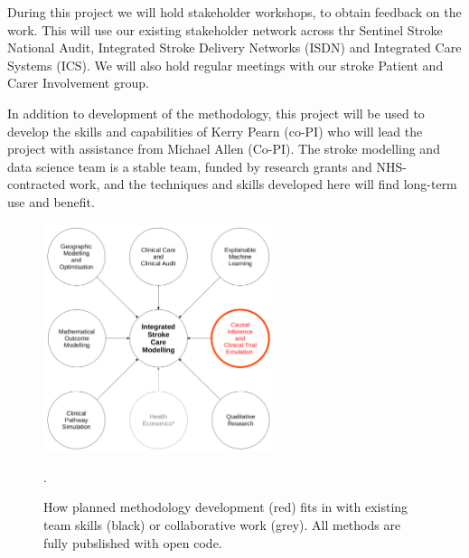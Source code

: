 During this project we will hold stakeholder workshops, to obtain feedback on the work. This will use our existing stakeholder network across thr Sentinel Stroke National Audit, Integrated Stroke Delivery Networks (ISDN) and Integrated Care Systems (ICS). We will also hold regular meetings with our stroke Patient and Carer Involvement group.

In addition to development of the methodology, this project will be used to develop the skills and capabilities of Kerry Pearn (co-PI) who will lead the project with assistance from Michael Allen (Co-PI). The stroke modelling and data science team is a stable team, funded by research grants and NHS-contracted work, and the techniques and skills developed here will find long-term use and benefit.


\begin{figure}[htbp]
\centering
\includegraphics[width=0.6\textwidth]{./images/expertise}
\caption{How planned methodology development (red) fits in with existing team skills (black) or collaborative work (grey). All methods are fully pubslished with open code.}.
\label{fig:expertise}
\end{figure}
